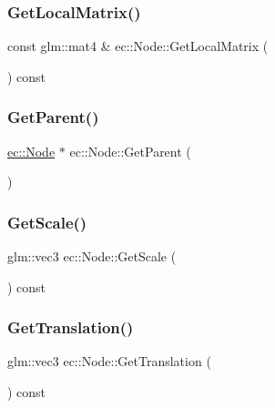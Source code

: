 \subsubsection{\texorpdfstring{Get\+Local\+Matrix()}{GetLocalMatrix()}}
{\footnotesize\ttfamily const glm\+::mat4 \& ec\+::\+Node\+::\+Get\+Local\+Matrix (\begin{DoxyParamCaption}{ }\end{DoxyParamCaption}) const}

\mbox{\label{classec_1_1_node_a88919835b03a7055f4c1c50c68b83fac}} 
\subsubsection{\texorpdfstring{Get\+Parent()}{GetParent()}}
{\footnotesize\ttfamily \mbox{\hyperlink{classec_1_1_node}{ec\+::\+Node}} $\ast$ ec\+::\+Node\+::\+Get\+Parent (\begin{DoxyParamCaption}{ }\end{DoxyParamCaption})}

\mbox{\label{classec_1_1_node_ac77ed7b5dd0920f72484a36b665f8883}} 
\subsubsection{\texorpdfstring{Get\+Scale()}{GetScale()}}
{\footnotesize\ttfamily glm\+::vec3 ec\+::\+Node\+::\+Get\+Scale (\begin{DoxyParamCaption}{ }\end{DoxyParamCaption}) const}

\mbox{\label{classec_1_1_node_ae29fe5673f7007449d2efa0e599ac0db}} 
\subsubsection{\texorpdfstring{Get\+Translation()}{GetTranslation()}}
{\footnotesize\ttfamily glm\+::vec3 ec\+::\+Node\+::\+Get\+Translation (\begin{DoxyParamCaption}{ }\end{DoxyParamCaption}) const}

